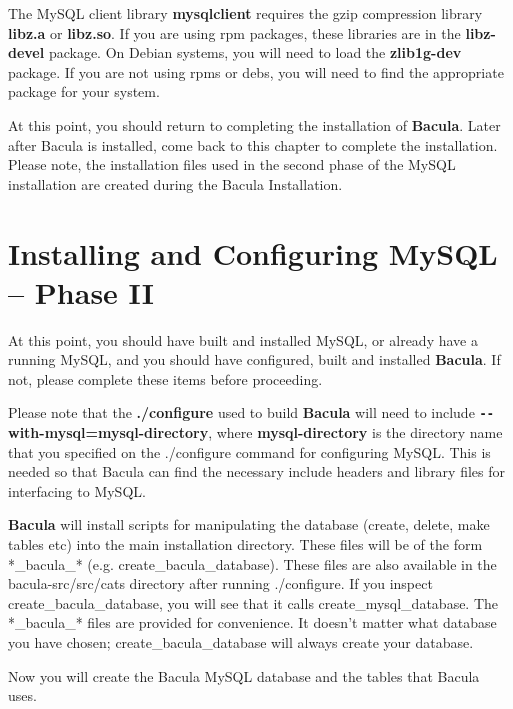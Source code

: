 The MySQL client library {\bf mysqlclient} requires the gzip compression
library {\bf libz.a} or {\bf libz.so}. If you are using rpm packages, these
libraries are in the {\bf libz-devel} package. On Debian systems, you will
need to load the {\bf zlib1g-dev} package. If you are not using rpms or debs,
you will need to find the appropriate package for your system. 

At this point, you should return to completing the installation of {\bf
Bacula}. Later after Bacula is installed, come back to this chapter to
complete the installation. Please note, the installation files used in the
second phase of the MySQL installation are created during the Bacula
Installation. 

\label{mysql_phase2}
\section{Installing and Configuring MySQL -- Phase II}

At this point, you should have built and installed MySQL, or already have a
running MySQL, and you should have configured, built and installed {\bf
Bacula}. If not, please complete these items before proceeding. 

Please note that the {\bf ./configure} used to build {\bf Bacula} will need to
include {\bf \verb:--:with-mysql=mysql-directory}, where {\bf mysql-directory} is the
directory name that you specified on the ./configure command for configuring
MySQL. This is needed so that Bacula can find the necessary include headers
and library files for interfacing to MySQL. 

{\bf Bacula} will install scripts for manipulating the database (create,
delete, make tables etc) into the main installation directory. These files
will be of the form *\_bacula\_* (e.g. create\_bacula\_database). These files
are also available in the \lt{}bacula-src\gt{}/src/cats directory after
running ./configure. If you inspect create\_bacula\_database, you will see
that it calls create\_mysql\_database. The *\_bacula\_* files are provided for
convenience. It doesn't matter what database you have chosen;
create\_bacula\_database will always create your database. 

Now you will create the Bacula MySQL database and the tables that Bacula uses.


